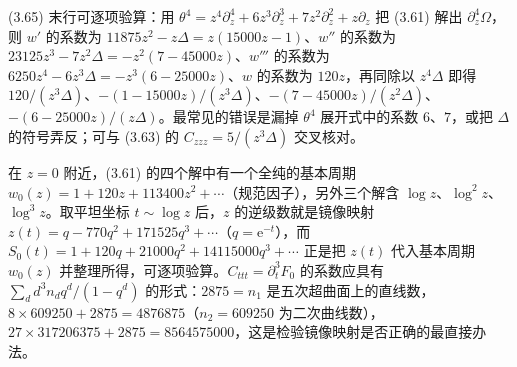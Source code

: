 \begin{yizhu}[易错点]
(3.65) 末行可逐项验算：用 $\theta^4=z^4\partial_z^4+6z^3\partial_z^3+7z^2\partial_z^2+z\partial_z$ 把 (3.61) 解出 $\partial_z^4\Omega$，则 $w'$ 的系数为 $11875z^2-z\Delta=z(15000z-1)$、$w''$ 的系数为 $23125z^3-7z^2\Delta=-z^2(7-45000z)$、$w'''$ 的系数为 $6250z^4-6z^3\Delta=-z^3(6-25000z)$、$w$ 的系数为 $120z$，再同除以 $z^4\Delta$ 即得 $120/(z^3\Delta)$、$-(1-15000z)/(z^3\Delta)$、$-(7-45000z)/(z^2\Delta)$、$-(6-25000z)/(z\Delta)$。最常见的错误是漏掉 $\theta^4$ 展开式中的系数 $6$、$7$，或把 $\Delta$ 的符号弄反；可与 (3.63) 的 $C_{zzz}=5/(z^3\Delta)$ 交叉核对。
\end{yizhu}

\begin{yizhu}[物理图像]
在 $z=0$ 附近，(3.61) 的四个解中有一个全纯的基本周期 $w_0(z)=1+120z+113400z^2+\cdots$（规范因子），另外三个解含 $\log z$、$\log^2z$、$\log^3z$。取平坦坐标 $t\sim\log z$ 后，$z$ 的逆级数就是镜像映射 $z(t)=q-770q^2+171525q^3+\cdots$（$q=\mathrm{e}^{-t}$），而 $S_0(t)=1+120q+21000q^2+14115000q^3+\cdots$ 正是把 $z(t)$ 代入基本周期 $w_0(z)$ 并整理所得，可逐项验算。$C_{ttt}=\partial_t^3F_0$ 的系数应具有 $\sum_d d^3n_dq^d/(1-q^d)$ 的形式：$2875=n_1$ 是五次超曲面上的直线数，$8\times609250+2875=4876875$（$n_2=609250$ 为二次曲线数），$27\times317206375+2875=8564575000$，这是检验镜像映射是否正确的最直接办法。
\end{yizhu}
